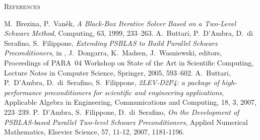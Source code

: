 \begin{thebibliography}{99}
         {\textsc{References}}


%
%
M.~Brezina, P.~Van{\v e}k,
{\em A Black-Box Iterative Solver Based on a Two-Level Schwarz Method},
Computing, 63, 1999, 233--263.
%
A.~Buttari, P.~D'Ambra, D.~di Serafino, S.~Filippone,
{\em Extending PSBLAS to Build Parallel Schwarz Preconditioners},
in , J.~Dongarra, K.~Madsen, J.~Wasniewski, editors,
Proceedings of PARA~04 Workshop on State of the Art
in Scientific Computing, Lecture Notes in Computer Science,
Springer, 2005, 593--602.
%
 A.~Buttari, P.~D'Ambra, D.~di~Serafino, S.~Filippone,
{\em 2LEV-D2P4: a package of high-performance preconditioners
for scientific and engineering applications},
Applicable Algebra in Engineering, Communications and Computing, 
18, 3, 2007, 223--239.
%
  P.~D'Ambra, S.~Filippone,  D.~di~Serafino,
{\em On the Development of PSBLAS-based Parallel Two-level Schwarz Preconditioners},
Applied Numerical Mathematics, Elsevier Science, 
57, 11-12, 2007, 1181-1196.


\end{thebibliography}
